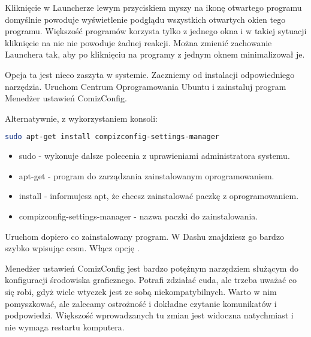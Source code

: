 Kliknięcie w Launcherze lewym przyciskiem myszy na ikonę otwartego programu domyślnie powoduje wyświetlenie podglądu wszystkich otwartych okien tego programu. Większość programów korzysta tylko z jednego okna i w takiej sytuacji kliknięcie na nie nie powoduje żadnej reakcji. Można zmienić zachowanie Launchera tak, aby po kliknięciu na programy z jednym oknem minimalizował je.

Opcja ta jest nieco zaszyta w systemie. Zaczniemy od instalacji odpowiedniego narzędzia. Uruchom \textcolor{ubuntu_orange}{Centrum Oprogramowania Ubuntu} i zainstaluj program \textcolor{ubuntu_orange}{Menedżer ustawień ComizConfig}.

Alternatywnie, z wykorzystaniem konsoli:
\begin{lstlisting}[language=bash]
sudo apt-get install compizconfig-settings-manager
\end{lstlisting}
\begin{itemize}
\item \textcolor{ubuntu_orange}{sudo} - wykonuje dalsze polecenia z uprawieniami administratora systemu.
\item \textcolor{ubuntu_orange}{apt-get} - program do zarządzania zainstalowanym oprogramowaniem.
\item \textcolor{ubuntu_orange}{install} - informujesz apt, że chcesz zainstalować paczkę z oprogramowaniem.
\item \textcolor{ubuntu_orange}{compizconfig-settings-manager} - nazwa paczki do zainstalowania.
\end{itemize}
Uruchom dopiero co zainstalowany program. W Dashu znajdziesz go bardzo szybko wpisując \textcolor{ubuntu_orange}{ccsm}. Włącz opcję .

Menedżer ustawień ComizConfig jest bardzo potężnym narzędziem służącym do konfiguracji środowiska graficznego. Potrafi zdziałać cuda, ale trzeba uważać co się robi, gdyż wiele wtyczek jest ze sobą niekompatybilnych. Warto w nim pomyszkować, ale zalecamy ostrożność i dokładne czytanie komunikatów i podpowiedzi. Większość wprowadzanych tu zmian jest widoczna natychmiast i nie wymaga restartu komputera.